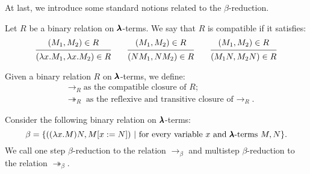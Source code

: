 At last, we introduce some standard notions related to the $\beta$-reduction.

\begin{definition}
  Let $R$ be a binary relation on $\pmb{\lambda}$-terms.
  We say that $R$ is compatible if it satisfies:
  \[
    \begin{prooftree}
      \hypo{ (M_1, M_2) \in R }
      \infer1{ (\lambda x . M_1, \lambda x . M_2) \in R } 
    \end{prooftree}
    \qquad
    \begin{prooftree}
      \hypo{ (M_1, M_2) \in R }
      \infer1{ (N M_1, N M_2) \in R } 
    \end{prooftree}
    \qquad
    \begin{prooftree}
      \hypo{ (M_1, M_2) \in R }
      \infer1{ (M_1 N, M_2 N) \in R }
    \end{prooftree}
  \]
\end{definition}

\begin{notation}
  Given a binary relation $R$ on $\pmb{\lambda}$-terms, we define:
  \begin{align*}
    & \to_R \text{as the compatible closure of $R$} ; \\
    & \twoheadrightarrow_R \text{as the reflexive and transitive closure of $\to_R$}.
  \end{align*}
\end{notation}

\begin{comment}
\begin{definition}[$\alpha$-equivalence]
  Consider the following binary relation on $\Lam$-terms:  
  \[
    \alpha = \{ (\lambda x . M, \lambda y . M[x := y]) \
                | \ \text{for every $\Lam$-term $M$ and variable $y$ not occurring in $M$} \}.
  \]  
  We call $\alpha$-equivalence to the equivalence relation $=_\alpha$.
\end{definition}
\end{comment}

\begin{definition}
  \label{beta-reduction}
  Consider the following binary relation on $\pmb{\lambda}$-terms:  
  \[
    \beta = \{ ((\lambda x . M) N, M[x := N]) \
                | \ \text{for every variable $x$ and $\pmb{\lambda}$-terms $M, N$} \}.
  \]  
  We call one step $\beta$-reduction to the relation $\to_\beta$ and multistep $\beta$-reduction to the relation $\twoheadrightarrow_\beta$.
\end{definition}

